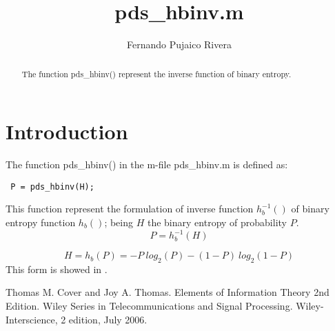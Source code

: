 \documentclass[a4paper,10pt]{article}
\title{pds\_hbinv.m}
\author{Fernando Pujaico Rivera}
\begin{document}
\maketitle
\begin{abstract}
The function pds\_hbinv() represent the inverse function of binary entropy.
\end{abstract}

\section{Introduction}
The function pds\_hbinv() in the m-file pds\_hbinv.m is defined as:
\lstset{language=octave}%
\begin{lstlisting}
 P = pds_hbinv(H);
\end{lstlisting}
This function represent the formulation of inverse function $h_b^{-1}()$ of binary entropy 
function $h_b()$; being  $H$ the binary entropy of probability $P$.
\begin{equation}\label{eq:hbinv}
 P=h_b^{-1}(H)
\end{equation}

\begin{equation}\label{eq:hb}
H=h_b(P)=-P~log_2(P) -(1-P)~log_2(1-P)
\end{equation}
This form is showed in \cite{thomas}.

 \begin{thebibliography}{99}
 
Thomas M. Cover and Joy A. Thomas. Elements of Information Theory 2nd Edition. 
Wiley Series in Telecommunications and Signal Processing. 
Wiley-Interscience, 2 edition, July 2006.



 \end{thebibliography} 
\end{document}
